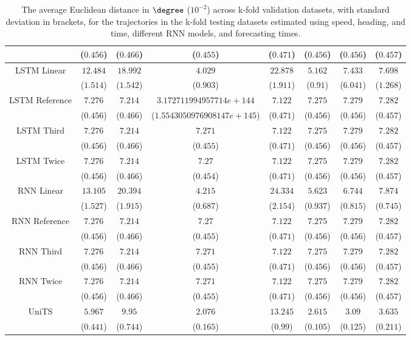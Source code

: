 \begin{table}[!ht]
{\begin{tabular}{|c|c|c|c|c|c|c|c|}
			 & ($0.456$) & ($0.466$) & ($0.455$) & ($0.471$) & ($0.456$) & ($0.456$) & ($0.457$) \\ \hline
			\multirow{2}{*}{LSTM Linear} & $12.484$ & $18.992$ & $4.029$ & $22.878$ & $5.162$ & $7.433$ & $7.698$ \\
			 & ($1.514$) & ($1.542$) & ($0.903$) & ($1.911$) & ($0.91$) & ($6.041$) & ($1.268$) \\ \hline
			\multirow{2}{*}{LSTM Reference} & $7.276$ & $7.214$ & $3.172711994957714e+144$ & $7.122$ & $7.275$ & $7.279$ & $7.282$ \\
			 & ($0.456$) & ($0.466$) & ($1.5543050976908147e+145$) & ($0.471$) & ($0.456$) & ($0.456$) & ($0.457$) \\ \hline
			\multirow{2}{*}{LSTM Third} & $7.276$ & $7.214$ & $7.271$ & $7.122$ & $7.275$ & $7.279$ & $7.282$ \\
			 & ($0.456$) & ($0.466$) & ($0.455$) & ($0.471$) & ($0.456$) & ($0.456$) & ($0.457$) \\ \hline
			\multirow{2}{*}{LSTM Twice} & $7.276$ & $7.214$ & $7.27$ & $7.122$ & $7.275$ & $7.279$ & $7.282$ \\
			 & ($0.456$) & ($0.466$) & ($0.454$) & ($0.471$) & ($0.456$) & ($0.456$) & ($0.457$) \\ \hline
			\multirow{2}{*}{RNN Linear} & $13.105$ & $20.394$ & $4.215$ & $24.334$ & $5.623$ & $6.744$ & $7.874$ \\
			 & ($1.527$) & ($1.915$) & ($0.687$) & ($2.154$) & ($0.937$) & ($0.815$) & ($0.745$) \\ \hline
			\multirow{2}{*}{RNN Reference} & $7.276$ & $7.214$ & $7.27$ & $7.122$ & $7.275$ & $7.279$ & $7.282$ \\
			 & ($0.456$) & ($0.466$) & ($0.455$) & ($0.471$) & ($0.456$) & ($0.456$) & ($0.457$) \\ \hline
			\multirow{2}{*}{RNN Third} & $7.276$ & $7.214$ & $7.271$ & $7.122$ & $7.275$ & $7.279$ & $7.282$ \\
			 & ($0.456$) & ($0.466$) & ($0.455$) & ($0.471$) & ($0.456$) & ($0.456$) & ($0.457$) \\ \hline
			\multirow{2}{*}{RNN Twice} & $7.276$ & $7.214$ & $7.271$ & $7.122$ & $7.275$ & $7.279$ & $7.282$ \\
			 & ($0.456$) & ($0.466$) & ($0.455$) & ($0.471$) & ($0.456$) & ($0.456$) & ($0.457$) \\ \hline
			\multirow{2}{*}{UniTS} & $5.967$ & $9.95$ & $2.076$ & $13.245$ & $2.615$ & $3.09$ & $3.635$ \\
			 & ($0.441$) & ($0.744$) & ($0.165$) & ($0.99$) & ($0.105$) & ($0.125$) & ($0.211$) \\ \hline
		\end{tabular}
	}
	\caption{The average Euclidean distance in $\degree$ ($10^{-2}$) across k-fold validation datasets, with standard deviation in brackets, for the trajectories in the k-fold testing datasets estimated using speed, heading, and time, different RNN models, and forecasting times.}
	\label{tab:all_speed_actual_dir_euclid}
\end{table}